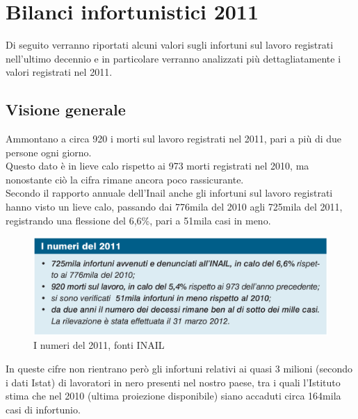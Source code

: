 
\section{Bilanci infortunistici 2011}
Di seguito verranno riportati alcuni valori sugli infortuni sul lavoro registrati nell'ultimo decennio e in particolare verranno analizzati più dettagliatamente i valori registrati nel 2011.

\subsection{Visione generale}


Ammontano a circa 920 i morti sul lavoro registrati nel 2011, pari a più di due persone ogni giorno.\\
Questo dato è in lieve calo rispetto ai 973 morti registrati nel 2010, ma nonostante ciò la cifra rimane ancora poco rassicurante.\\
Secondo il rapporto annuale dell'Inail anche gli infortuni sul lavoro registrati hanno visto un lieve calo, passando dai 776mila del 2010 agli 725mila del 2011, registrando una flessione del 6,6\%, pari a 51mila casi in meno.\\

\begin{figure}[H]
\centering
\includegraphics[scale=0.3]{images/cap4/analisiDiMercato/infortuniGenerale}
\caption{I numeri del 2011, fonti INAIL}
\end{figure}


In queste cifre non rientrano però gli infortuni relativi ai quasi 3 milioni (secondo i dati Istat) di lavoratori in nero presenti nel nostro paese, tra i quali l'Istituto stima che nel 2010 (ultima proiezione disponibile) siano accaduti circa 164mila casi di infortunio.\\

